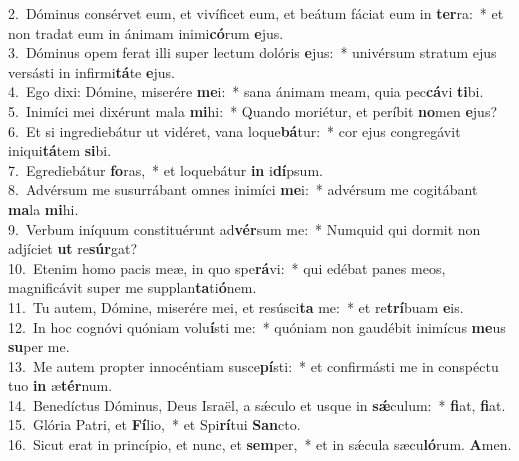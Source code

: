 {2.~}Dóminus consérvet eum, et vivíficet eum, et beátum fáciat eum in \textbf{ter}ra:~* et non tradat eum in ánimam inimi\textbf{có}rum \textbf{e}jus.\\
{3.~}Dóminus opem ferat illi super lectum dolóris \textbf{e}jus:~* univérsum stratum ejus versásti in infirmi\textbf{tá}te \textbf{e}jus.\\
{4.~}Ego dixi: Dómine, miserére \textbf{me}i:~* sana ánimam meam, quia pec\textbf{cá}vi \textbf{ti}bi.\\
{5.~}Inimíci mei dixérunt mala \textbf{mi}hi:~* Quando moriétur, et períbit \textbf{no}men \textbf{e}jus?\\
{6.~}Et si ingrediebátur ut vidéret, vana loque\textbf{bá}tur:~* cor ejus congregávit iniqui\textbf{tá}tem \textbf{si}bi.\\
{7.~}Egrediebátur \textbf{fo}ras,~* et loquebátur \textbf{in} i\textbf{dí}psum.\\
{8.~}Advérsum me susurrábant omnes inimíci \textbf{me}i:~* advérsum me cogitábant \textbf{ma}la \textbf{mi}hi.\\
{9.~}Verbum iníquum constituérunt ad\textbf{vér}sum me:~* Numquid qui dormit non adjíciet \textbf{ut} re\textbf{súr}gat?\\
{10.~}Etenim homo pacis meæ, in quo spe\textbf{rá}vi:~* qui edébat panes meos, magnificávit super me supplan\textbf{ta}ti\textbf{ó}nem.\\
{11.~}Tu autem, Dómine, miserére mei, et resúsci\textbf{ta} me:~* et re\textbf{trí}buam \textbf{e}is.\\
{12.~}In hoc cognóvi quóniam volu\textbf{í}sti me:~* quóniam non gaudébit inimícus \textbf{me}us \textbf{su}per me.\\
{13.~}Me autem propter innocéntiam susce\textbf{pí}sti:~* et confirmásti me in conspéctu tuo \textbf{in} æ\textbf{tér}num.\\
{14.~}Benedíctus Dóminus, Deus Israël, a sǽculo et usque in \textbf{sǽ}culum:~* \textbf{fi}at, \textbf{fi}at.\\
{15.~}Glória Patri, et \textbf{Fí}lio,~* et Spi\textbf{rí}tui \textbf{San}cto.\\
{16.~}Sicut erat in princípio, et nunc, et \textbf{sem}per,~* et in sǽcula sæcu\textbf{ló}rum. \textbf{A}men.\\
